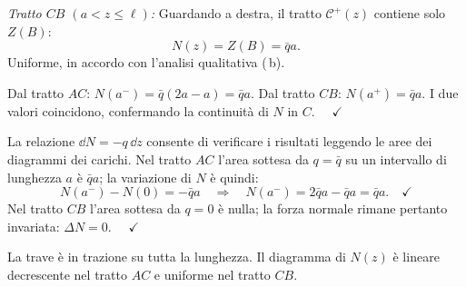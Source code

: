 \begin{esempio}
\begin{svolgimento}
		\textit{Tratto $CB$ $(a < z \leq \ell)$:}
		Guardando a destra, il tratto
		$\mathcal{C}^+(z)$ contiene solo $Z(B)$:
		\[
		N(z) = Z(B) = \bar{q}a.
		\]
		Uniforme, in accordo con l'analisi qualitativa (\,b).
		
		Dal tratto $AC$: $N(a^-) = \bar{q}(2a-a) = \bar{q}a$.
		Dal tratto $CB$: $N(a^+) = \bar{q}a$.
		I due valori coincidono, confermando la continuità
		di $N$ in $C$. $\quad\checkmark$
		
		La relazione $\dd N = -q\,\dd z$ consente di verificare
		i risultati leggendo le aree dei diagrammi
		dei carichi.
		Nel tratto $AC$ l'area sottesa da $q = \bar{q}$
		su un intervallo di lunghezza $a$ è $\bar{q}a$;
		la variazione di $N$ è quindi:
		\[
		N(a^-) - N(0) = -\bar{q}a
		\quad\Rightarrow\quad
		N(a^-) = 2\bar{q}a - \bar{q}a = \bar{q}a.
		\quad\checkmark
		\]
		Nel tratto $CB$ l'area sottesa da $q = 0$ è
		nulla; la forza normale rimane pertanto
		invariata: $\Delta N = 0$. $\quad\checkmark$
		
		\noindent
		La trave è in trazione su tutta la lunghezza.
		Il diagramma di $N(z)$ è lineare decrescente
		nel tratto $AC$ e uniforme nel tratto $CB$.
		
	\end{svolgimento}
\end{esempio}



